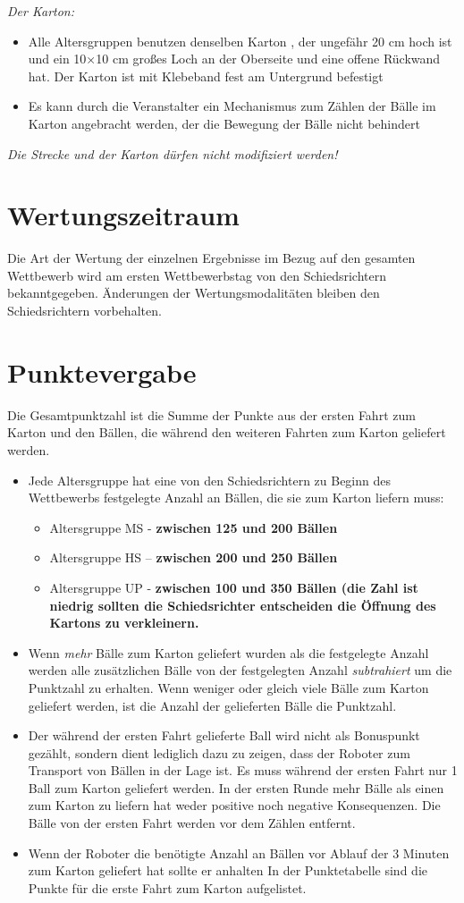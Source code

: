 \documentclass[a4paper,12pt]{article}
\begin{document}
\emph{Der Karton:}
\begin{itemize}
\item Alle Altersgruppen benutzen denselben Karton , der ungefähr 20 cm hoch ist und ein 10×10 cm großes Loch
an der Oberseite und eine offene Rückwand hat. Der Karton ist mit Klebeband fest am Untergrund befestigt
\item Es kann durch die Veranstalter ein Mechanismus zum Zählen der Bälle im Karton angebracht werden, der die
Bewegung der Bälle nicht behindert
\end{itemize}
\emph{Die Strecke und der Karton dürfen nicht modifiziert werden!}
\section{Wertungszeitraum}
\par Die Art der Wertung der einzelnen Ergebnisse im Bezug auf den gesamten Wettbewerb wird am ersten Wettbewerbstag von den Schiedsrichtern bekanntgegeben. Änderungen der Wertungsmodalitäten bleiben den Schiedsrichtern vorbehalten.
\section{Punktevergabe}
Die Gesamtpunktzahl ist die Summe der Punkte aus der ersten Fahrt zum Karton und den Bällen, die während
den weiteren Fahrten zum Karton geliefert werden.
\begin{itemize}
\item Jede Altersgruppe hat eine von den Schiedsrichtern zu Beginn des Wettbewerbs festgelegte Anzahl an Bällen, die sie zum Karton liefern muss:
\begin{itemize}
	\item Altersgruppe MS - \textbf{zwischen 125 und 200 Bällen}
\item Altersgruppe HS – \textbf{zwischen 200 und 250 Bällen}
\item Altersgruppe UP - \textbf{zwischen 100 und 350 Bällen (die Zahl ist niedrig sollten die Schiedsrichter
entscheiden die Öffnung des Kartons zu verkleinern.}
\end{itemize}
\item Wenn \emph{mehr} Bälle zum Karton geliefert wurden als die festgelegte Anzahl werden alle zusätzlichen Bälle von
der festgelegten Anzahl \emph{subtrahiert} um die Punktzahl zu erhalten. Wenn weniger oder gleich viele Bälle zum
Karton geliefert werden, ist die Anzahl der gelieferten Bälle die Punktzahl.
\item Der während der ersten Fahrt gelieferte Ball wird nicht als Bonuspunkt gezählt, sondern dient lediglich dazu
zu zeigen, dass der Roboter zum Transport von Bällen in der Lage ist. Es muss während der ersten Fahrt nur
1 Ball zum Karton geliefert werden. In der ersten Runde mehr Bälle als einen zum Karton zu liefern hat weder
positive noch negative Konsequenzen. Die Bälle von der ersten Fahrt werden vor dem Zählen entfernt.
\item Wenn der Roboter die benötigte Anzahl an Bällen vor Ablauf der 3 Minuten zum Karton geliefert hat sollte er
anhalten
In der Punktetabelle sind die Punkte für die erste Fahrt zum Karton aufgelistet.
\end{itemize}
\end{document}
